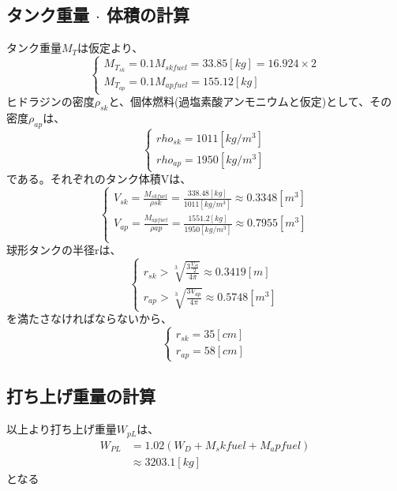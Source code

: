 \documentclass[15pt,uplatex,dvipdfmx]{jsarticle}
\begin{document}
\subsection{タンク重量 $\cdot$ 体積の計算}
タンク重量$M_T$は仮定より、
\begin{equation}
  \begin{cases}
    M_{T_{sk}} = 0.1M_{skfuel} = 33.85[kg] = 16.924 \times 2 \\
    M_{T_{ap}} = 0.1M_{apfuel} = 155.12[kg]
  \end{cases}
\end{equation}
ヒドラジンの密度$\rho_{sk}$と、個体燃料(過塩素酸アンモニウムと仮定)として、その
密度$\rho_{ap}$は、
\begin{equation}
  \begin{cases}
    rho_{sk} = 1011[kg/m^3] \\
    rho_{ap} = 1950[kg/m^3]
  \end{cases}
\end{equation}
である。それぞれのタンク体積Vは、
\begin{equation}
  \begin{cases}
    V_{sk} = \frac{M_{skfuel}}{\rho sk} = \frac{338.48[kg]}{1011[kg/m^3]}
     \approx 0.3348[m^3] \\
     V_{ap} = \frac{M_{apfuel}}{\rho ap} = \frac{1551.2[kg]}{1950[kg/m^3]}
      \approx 0.7955[m^3] \\
  \end{cases}
\end{equation}
球形タンクの半径rは、
\begin{equation}
  \begin{cases}
    r_{sk} > \sqrt[3]{\frac{3\frac{V_{sk}}{2}}{4\pi}} \approx 0.3419[m] \\
    r_{ap} > \sqrt[3]{\frac{3V_{ap}}{4\pi}} \approx 0.5748[m^3]
  \end{cases}
\end{equation}
を満たさなければならないから、
\begin{equation}
  \begin{cases}
    r_{sk} = 35[cm] \\
    r_{ap} = 58[cm]
  \end{cases}
\end{equation}

\subsection{打ち上げ重量の計算}
以上より打ち上げ重量$W_{pL}$は、
\begin{align*}
  W_{PL} & = 1.02(W_D + M_skfuel + M_apfuel) \\
         & \approx 3203.1[kg]
\end{align*}
となる





\setcounter{section}{1}
\end{document}
